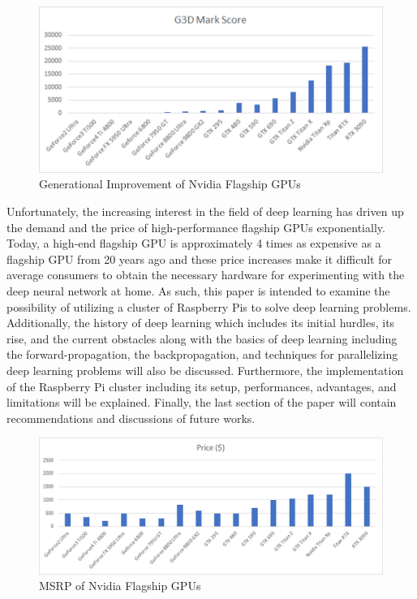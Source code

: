 \documentclass[conference]{IEEEtran}
\begin{document}
        \begin{figure}[!htb]
            \centering
            \captionsetup{justification=centering}
            \includegraphics[width=\linewidth]{GPU_Improvment.png}
            \caption{Generational Improvement of Nvidia Flagship GPUs}  
        \end{figure}
        
        Unfortunately, the increasing interest in the field of deep learning has driven up the demand and the price of high-performance flagship GPUs exponentially. Today, a high-end flagship GPU is approximately 4 times as expensive as a flagship GPU from 20 years ago \cite{passmark_software} and these price increases make it difficult for average consumers to obtain the necessary hardware for experimenting with the deep neural network at home. As such, this paper is intended to examine the possibility of utilizing a cluster of Raspberry Pis to solve deep learning problems. Additionally, the history of deep learning which includes its initial hurdles, its rise, and the current obstacles along with the basics of deep learning including the forward-propagation, the backpropagation, and techniques for parallelizing deep learning problems will also be discussed. Furthermore, the implementation of the Raspberry Pi cluster including its setup, performances, advantages, and limitations will be explained. Finally, the last section of the paper will contain recommendations and discussions of future works.

        \begin{figure}[!htb]
            \centering
            \captionsetup{justification=centering}
            \includegraphics[width=\linewidth]{GPU_Price.png}
            \caption{MSRP of Nvidia Flagship GPUs}  
        \end{figure}
\end{document}
